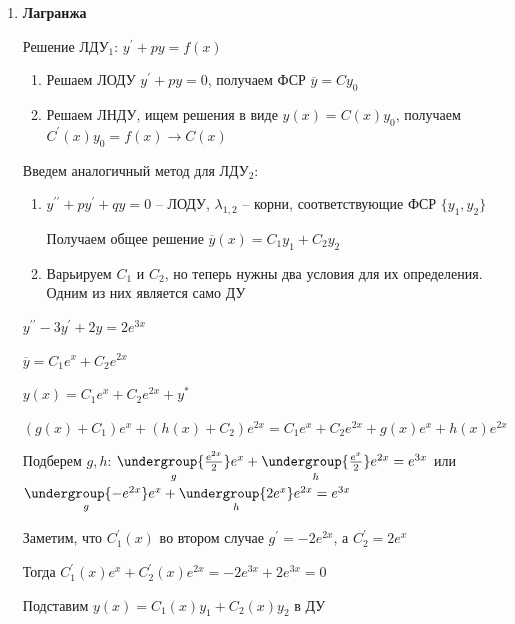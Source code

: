 \documentclass[12pt]{article}
\begin{document}
\begin{enumerate}
    $y(x) = C_1 e^{2x} + C_2 e^{2x} + xe^{2x}$

    \mediumvspace

    \hypertarget{methodLagrangesecondorder}{}

    \item \textbf{Лагранжа}

    \Mems Решение ЛДУ$_1$: $y^\prime + py = f(x)$

    \begin{enumerate}
        \item[1) ] Решаем ЛОДУ $y^\prime + py = 0$, получаем ФСР $\overline{y} = Cy_0$

        \item[2) ] Решаем ЛНДУ, ищем решения в виде $y(x) = C(x)y_0$, получаем $C^\prime(x) y_0 = f(x) \to C(x)$
    \end{enumerate}

    \Nota Введем аналогичный метод для ЛДУ$_2$:

    \begin{enumerate}
        \item[1 этап)] $y^{\prime\prime} + py^\prime + qy = 0$ -- ЛОДУ, $\lambda_{1, 2}$ -- корни, соответствующие ФСР $\{y_1, y_2\}$

        Получаем общее решение $\overline{y}(x) = C_1 y_1 + C_2 y_2$

        \item[2 этап)] Варьируем $C_1$ и $C_2$, но теперь нужны два условия для их определения. Одним из них является само ДУ
    \end{enumerate}

    \Ex $y^{\prime\prime} - 3y^\prime + 2y = 2e^{3x}$

    $\overline{y} = C_1 e^x + C_2 e^{2x}$

    $y(x) = C_1 e^x + C_2 e^{2x} + y^*$

    $(g(x) + C_1)e^x + (h(x) + C_2)e^{2x} = C_1 e^x + C_2 e^{2x} + g(x)e^x + h(x)e^{2x}$

    Подберем $g, h$: $\underset{g}{\undergroup{\frac{e^{2x}}{2}}}e^x + \underset{h}{\undergroup{\frac{e^x}{2}}}e^{2x} = e^{3x}$ или
    $\underset{g}{\undergroup{-e^{2x}}} e^x + \underset{h}{\undergroup{2e^x}} e^{2x} = e^{3x}$

    Заметим, что $C_1^\prime(x)$ во втором случае $g^\prime = -2e^{2x}$, а $C_2^\prime = 2e^x$

    Тогда $C_1^\prime(x) e^x + C^\prime_2 (x) e^{2x} = -2e^{3x} + 2e^{3x} = 0$

    \Nota Подставим $y(x) = C_1 (x) y_1 + C_2 (x) y_2$ в ДУ


\end{enumerate}
\end{document}
